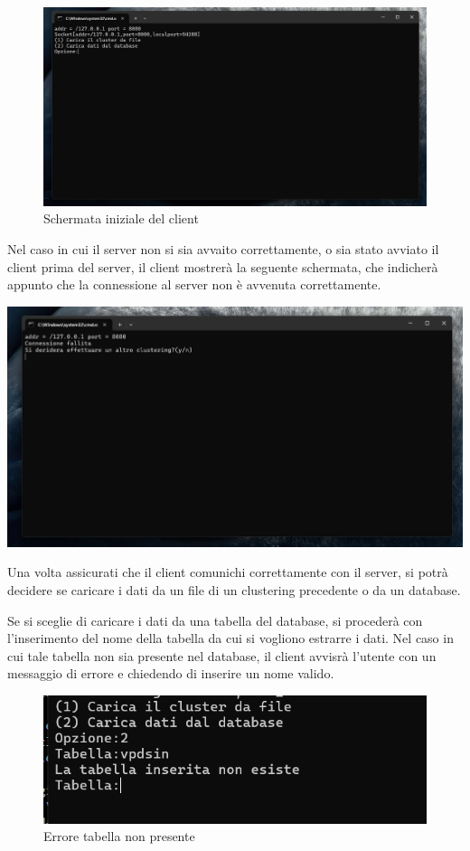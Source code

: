 \begin{figure}[h!]
    \centering
    \includegraphics[width = 0.5 \textwidth]{images/normale funzionamento lcient.png}
    \caption{Schermata iniziale del client}
    
\end{figure}

\begin{tcolorbox}[  colback=white!5!white, colframe=gray, title={Avvertenza} ]

    Nel caso in cui il server non si sia avvaito correttamente, o sia stato avviato il client prima del server, il client mostrerà la seguente schermata, che indicherà appunto che la connessione al server non è avvenuta correttamente.
    
    \begin{center} 
        \includegraphics[width = 0.5 \textwidth]{images/connessione fallita.png}
    \end{center}
        
\end{tcolorbox}

Una volta assicurati che il client comunichi correttamente con il server, si potrà decidere se caricare i dati da un file di un clustering precedente o da un database.


Se si sceglie di caricare i dati da una tabella del database, si procederà  con l'inserimento del nome della tabella da cui si vogliono estrarre i dati. Nel caso in cui tale tabella non sia presente nel database, il client avvisrà l'utente con un messaggio di errore e chiedendo di inserire un nome valido. 

\begin{figure}[h!]
    \centering
    \includegraphics[width = 0.5 \textwidth]{images/teabella inesistente.png}
    \caption{Errore tabella non presente}
\end{figure}

